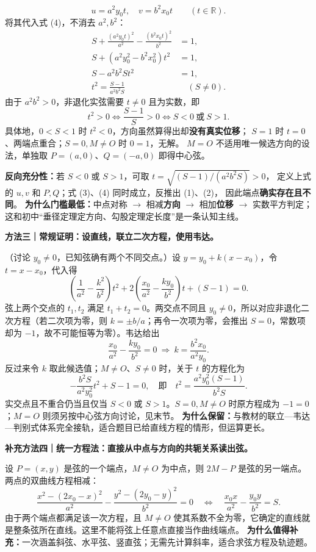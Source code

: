 \begin{proofbox}
\[
\boxed{u=a^2y_0t,\quad v=b^2x_0t}\qquad(t\in\mathbb R).
\]
将其代入式 (4)，不消去 $a^2,b^2$：
\[
\begin{aligned}
S+\frac{(a^2y_0t)^2}{a^2}-\frac{(b^2x_0t)^2}{b^2}&=1,\\
S+(a^2y_0^2-b^2x_0^2)t^2&=1,\\
S-a^2b^2St^2&=1,\\
\boxed{t^2=\frac{S-1}{a^2b^2S}}&\quad(S\ne0).
\end{aligned}
\]
由于 $a^2b^2>0$，非退化实弦需要 $t\ne0$ 且为实数，即
\[
\boxed{t^2>0\iff \frac{S-1}{S}>0\iff S<0\ \text{或}\ S>1}.
\]
具体地，$0<S<1$ 时 $t^2<0$，方向虽然算得出却\textbf{没有真实位移}；
$S=1$ 时 $t=0$、两端点重合；$S=0,M\ne O$ 时 $0=1$，无解。
$M=O$ 不适用唯一候选方向的设法，单独取 $P=(a,0)$、$Q=(-a,0)$ 即得中心弦。
\par\smallskip\noindent
\textbf{反向充分性：}若 $S<0$ 或 $S>1$，可取 $t=\sqrt{(S-1)/(a^2b^2S)}>0$，
定义上式的 $u,v$ 和 $P,Q$；式 (3)、(4) 同时成立，反推出 (1)、(2)，
因此端点\textbf{确实存在且不同}。
\textbf{为什么门槛最低：}中点对称 $\to$ 相减\textbf{方向} $\to$ 相加\textbf{位移} $\to$ 实数平方判定；
这和初中``垂径定理定方向、勾股定理定长度''是一条认知主线。
\end{proofbox}
\clearpage
\begin{proofbox}
\textbf{方法三｜常规证明：设直线，联立二次方程，使用韦达。}
\begin{center}\end{center}
（讨论 $y_0\ne0$，已知弦确有两个不同交点。）设
$y=y_0+k(x-x_0)$，令 $t=x-x_0$，代入得
\[
\left(\frac1{a^2}-\frac{k^2}{b^2}\right)t^2
+2\left(\frac{x_0}{a^2}-\frac{ky_0}{b^2}\right)t
+(S-1)=0.
\]
弦上两个交点的 $t_1,t_2$ 满足 $t_1+t_2=0$。两交点不同且 $y_0\ne0$，所以对应非退化二次方程（若二次项为零，则 $k=\pm b/a$；再令一次项为零，会推出 $S=0$，常数项却为 $-1$，故不可能恒等为零）。韦达给出
\[
\frac{x_0}{a^2}-\frac{ky_0}{b^2}=0
\ \Longrightarrow\ \boxed{k=\frac{b^2x_0}{a^2y_0}}.
\]
反过来令 $k$ 取此候选值；$M\ne O$、$S\ne0$ 时，关于 $t$ 的方程化为
\[
-\frac{b^2S}{a^2y_0^2}t^2+S-1=0,
\quad\text{即}\quad
t^2=\frac{a^2y_0^2(S-1)}{b^2S}.
\]
实交点且不重合仍当且仅当 $S<0$ 或 $S>1$。$S=0,M\ne O$ 时原方程成为 $-1=0$；$M=O$ 则须另按中心弦方向讨论，见末节。
\textbf{为什么保留：}与教材的联立—韦达—判别式体系完全接轨，适合题目已给直线方程的情形，但运算更长。
\end{proofbox}
\clearpage
\begin{proofbox}
\textbf{补充方法四｜统一方程法：直接从中点与方向的共轭关系读出弦。}
\begin{center}\end{center}
设 $P=(x,y)$ 是弦的一个端点，$M\ne O$ 为中点，则 $2M-P$ 是弦的另一端点。
两点的双曲线方程相减：
\[
\frac{x^2-(2x_0-x)^2}{a^2}-\frac{y^2-(2y_0-y)^2}{b^2}=0
\quad\Longleftrightarrow\quad
\boxed{\frac{x_0x}{a^2}-\frac{y_0y}{b^2}=S}.
\]
由于两个端点都满足该一次方程，且 $M\ne O$ 使其系数不全为零，它确定的直线就是整条弦所在直线。这里不能将弦上任意点直接当作曲线端点。
\textbf{为什么值得补充：}一次涵盖斜弦、水平弦、竖直弦；无需先计算斜率，适合求弦方程及轨迹题。
\end{proofbox}
